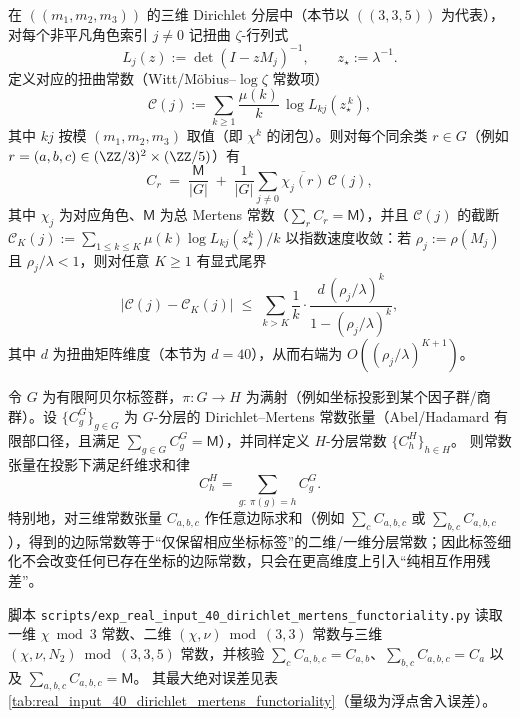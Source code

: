 \begin{remark}\label{thm:arity-dirichlet-explicit-constant}
在 \(((m_1,m_2,m_3))\) 的三维 Dirichlet 分层中（本节以 \(((3,3,5))\) 为代表），对每个非平凡角色索引 \(j\neq 0\) 记扭曲 \(\zeta\)-行列式
\[
L_j(z):=\det(I-zM_j)^{-1},
\qquad
z_\star:=\lambda^{-1}.
\]
定义对应的扭曲常数（Witt/Möbius--\(\log\zeta\) 常数项）
\[
\mathcal{C}(j):=\sum_{k\ge 1}\frac{\mu(k)}{k}\,\log L_{kj}\!\left(z_\star^{\,k}\right),
\]
其中 \(kj\) 按模 \((m_1,m_2,m_3)\) 取值（即 \(\chi^{k}\) 的闭包）。则对每个同余类 \(r\in G\)（例如 \(r=(a,b,c)\in(\ZZ/3)^2\times(\ZZ/5)\)）有
\[
C_r
\;=\;
\frac{\mathsf{M}}{|G|}
\;+\;
\frac{1}{|G|}\sum_{j\neq 0}\overline{\chi_j(r)}\,\mathcal{C}(j),
\]
其中 \(\chi_j\) 为对应角色、\(\mathsf{M}\) 为总 Mertens 常数（\(\sum_r C_r=\mathsf{M}\)），并且 \(\mathcal{C}(j)\) 的截断
\(
\mathcal{C}_K(j):=\sum_{1\le k\le K}\mu(k)\log L_{kj}(z_\star^k)/k
\)
以指数速度收敛：若 \(\rho_j:=\rho(M_j)\) 且 \(\rho_j/\lambda<1\)，则对任意 \(K\ge 1\) 有显式尾界
\[
\left|\mathcal{C}(j)-\mathcal{C}_K(j)\right|
\;\le\;
\sum_{k>K}\frac{1}{k}\cdot
\frac{d\,(\rho_j/\lambda)^k}{1-(\rho_j/\lambda)^k},
\]
其中 \(d\) 为扭曲矩阵维度（本节为 \(d=40\)），从而右端为 \(O((\rho_j/\lambda)^{K+1})\)。
\end{remark}

\begin{remark}\label{thm:dirichlet-mertens-functoriality}
令 \(G\) 为有限阿贝尔标签群，\(\pi:G\to H\) 为满射（例如坐标投影到某个因子群/商群）。设
\(\{C^G_g\}_{g\in G}\) 为 \(G\)-分层的 Dirichlet--Mertens 常数张量（Abel/Hadamard 有限部口径，且满足 \(\sum_{g\in G}C^G_g=\mathsf{M}\)），并同样定义 \(H\)-分层常数 \(\{C^H_h\}_{h\in H}\)。
则常数张量在投影下满足纤维求和律
\[
C^H_h=\sum_{g:\ \pi(g)=h}C^G_g.
\]
特别地，对三维常数张量 \(C_{a,b,c}\) 作任意边际求和（例如 \(\sum_c C_{a,b,c}\) 或 \(\sum_{b,c}C_{a,b,c}\)），得到的边际常数等于“仅保留相应坐标标签”的二维/一维分层常数；因此标签细化不会改变任何已存在坐标的边际常数，只会在更高维度上引入“纯相互作用残差”。
\end{remark}

\begin{remark}\label{rem:dirichlet-mertens-functoriality-check}
脚本 \texttt{scripts/exp\_real\_input\_40\_dirichlet\_mertens\_functoriality.py} 读取一维 \(\chi\bmod 3\) 常数、二维 \((\chi,\nu)\bmod(3,3)\) 常数与三维 \((\chi,\nu,N_2)\bmod(3,3,5)\) 常数，并核验
\(\sum_c C_{a,b,c}=C_{a,b}\)、\(\sum_{b,c}C_{a,b,c}=C_a\) 以及 \(\sum_{a,b,c}C_{a,b,c}=\mathsf{M}\)。
其最大绝对误差见表 \ref{tab:real_input_40_dirichlet_mertens_functoriality}（量级为浮点舍入误差）。
\end{remark}

